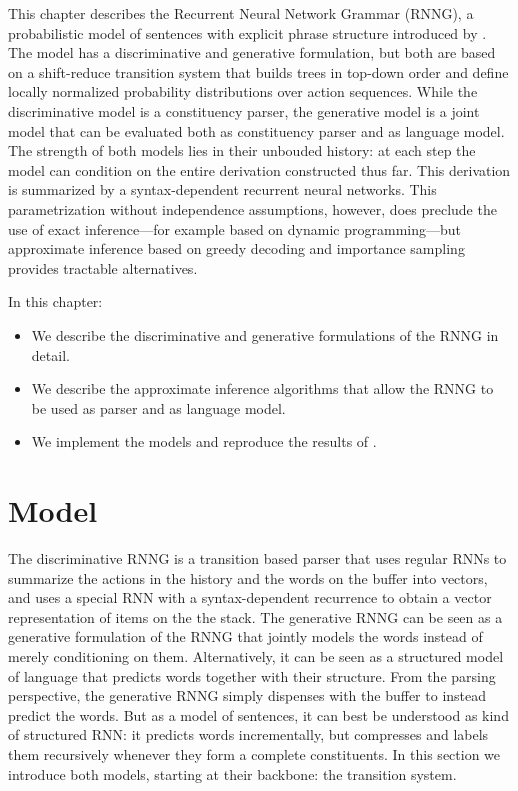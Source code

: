 This chapter describes the Recurrent Neural Network Grammar (RNNG), a probabilistic model of sentences with explicit phrase structure introduced by \citet{dyer2016rnng}. The model has a discriminative and generative formulation, but both are based on a shift-reduce transition system that builds trees in top-down order and define locally normalized probability distributions over action sequences. While the discriminative model is a constituency parser, the generative model is a joint model that can be evaluated both as constituency parser and as language model. The strength of both models lies in their unbouded history: at each step the model can condition on the entire derivation constructed thus far. This derivation is summarized by a syntax-dependent recurrent neural networks. This parametrization without independence assumptions, however, does preclude the use of exact inference---for example based on dynamic programming---but approximate inference based on greedy decoding and importance sampling provides tractable alternatives.

In this chapter:
\begin{itemize}
  \item We describe the discriminative and generative formulations of the RNNG in detail.
  \item We describe the approximate inference algorithms that allow the RNNG to be used as parser and as language model.
  \item We implement the models and reproduce the results of \citet{dyer2016rnng}.
\end{itemize}

\section{Model}
  The discriminative RNNG is a transition based parser that uses regular RNNs to summarize the actions in the history and the words on the buffer into vectors, and uses a special RNN with a syntax-dependent recurrence to obtain a vector representation of items on the the stack. The generative RNNG can be seen as a generative formulation of the RNNG that jointly models the words instead of merely conditioning on them. Alternatively, it can be seen as a structured model of language that predicts words together with their structure. From the parsing perspective, the generative RNNG simply dispenses with the buffer to instead predict the words. But as a model of sentences, it can best be understood as kind of structured RNN: it predicts words incrementally, but compresses and labels them recursively whenever they form a complete constituents. In this section we introduce both models, starting at their backbone: the transition system.

